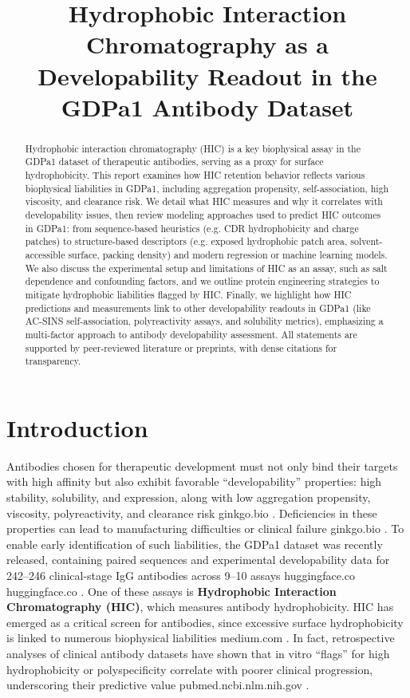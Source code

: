 \documentclass[12pt]{article}
\title{\textbf{Hydrophobic Interaction Chromatography as a Developability Readout in the GDPa1 Antibody Dataset}}
\author{}
\date{}
\begin{document}
\maketitle

\begin{abstract}
Hydrophobic interaction chromatography (HIC) is a key biophysical assay in the GDPa1 dataset of therapeutic antibodies, serving as a proxy for surface hydrophobicity. This report examines how HIC retention behavior reflects various biophysical liabilities in GDPa1, including aggregation propensity, self-association, high viscosity, and clearance risk. We detail what HIC measures and why it correlates with developability issues, then review modeling approaches used to predict HIC outcomes in GDPa1: from sequence-based heuristics (e.g. CDR hydrophobicity and charge patches) to structure-based descriptors (e.g. exposed hydrophobic patch area, solvent-accessible surface, packing density) and modern regression or machine learning models. We also discuss the experimental setup and limitations of HIC as an assay, such as salt dependence and confounding factors, and we outline protein engineering strategies to mitigate hydrophobic liabilities flagged by HIC. Finally, we highlight how HIC predictions and measurements link to other developability readouts in GDPa1 (like AC-SINS self-association, polyreactivity assays, and solubility metrics), emphasizing a multi-factor approach to antibody developability assessment. All statements are supported by peer-reviewed literature or preprints, with dense citations for transparency.
\end{abstract}

\section{Introduction}
Antibodies chosen for therapeutic development must not only bind their targets with high affinity but also exhibit favorable “developability” properties: high stability, solubility, and expression, along with low aggregation propensity, viscosity, polyreactivity, and clearance risk
ginkgo.bio
. Deficiencies in these properties can lead to manufacturing difficulties or clinical failure
ginkgo.bio
. To enable early identification of such liabilities, the GDPa1 dataset was recently released, containing paired sequences and experimental developability data for 242–246 clinical-stage IgG antibodies across 9–10 assays
huggingface.co
huggingface.co
. One of these assays is \textbf{Hydrophobic Interaction Chromatography (HIC)}, which measures antibody hydrophobicity. HIC has emerged as a critical screen for antibodies, since excessive surface hydrophobicity is linked to numerous biophysical liabilities
medium.com
. In fact, retrospective analyses of clinical antibody datasets have shown that in vitro “flags” for high hydrophobicity or polyspecificity correlate with poorer clinical progression, underscoring their predictive value
pubmed.ncbi.nlm.nih.gov
.
\end{document}
